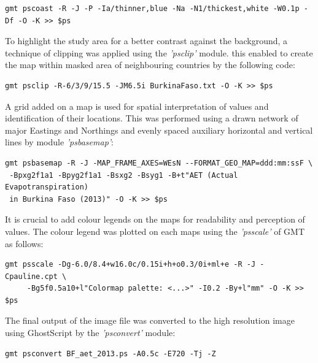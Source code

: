 \documentclass[knowledge,article,submit,pdftex,moreauthors]{Definitions/mdpi}
\begin{document}
 \begin{small}
 \begin{verbatim}
gmt pscoast -R -J -P -Ia/thinner,blue -Na -N1/thickest,white -W0.1p -Df -O -K >> $ps
  \end{verbatim} 
 \end{small}
 
 To highlight the study area for a better contrast against the background, a technique of clipping was applied using the \emph{'psclip'} module. this enabled to create the map within masked area of neighbouring countries by the following code: 
 
\begin{small}
 \begin{verbatim}
gmt psclip -R-6/3/9/15.5 -JM6.5i BurkinaFaso.txt -O -K >> $ps
   \end{verbatim} 
 \end{small}
 
 A grid added on a map is used for spatial interpretation of values and identification of their locations. This was performed using a drawn network of major Eastings and Northings and evenly spaced auxiliary horizontal and vertical lines by module \emph{'psbasemap'}:
 
 \begin{small}
 \begin{verbatim}
gmt psbasemap -R -J -MAP_FRAME_AXES=WEsN --FORMAT_GEO_MAP=ddd:mm:ssF \
 -Bpxg2f1a1 -Bpyg2f1a1 -Bsxg2 -Bsyg1 -B+t"AET (Actual Evapotranspiration) 
 in Burkina Faso (2013)" -O -K >> $ps
     \end{verbatim} 
 \end{small}
 
It is crucial to add colour legends on the maps for readability and perception of values. The colour legend was plotted on each maps using the \emph{'psscale'} of GMT as follows: 
 
 \begin{small}
 \begin{verbatim}
gmt psscale -Dg-6.0/8.4+w16.0c/0.15i+h+o0.3/0i+ml+e -R -J -Cpauline.cpt \
     -Bg5f0.5a10+l"Colormap palette: <...>" -I0.2 -By+l"mm" -O -K >> $ps
    \end{verbatim} 
 \end{small}

The final output of the image file was converted to the high resolution image using GhostScript by the \emph{'psconvert'} module: 

\begin{small}
\begin{verbatim}
gmt psconvert BF_aet_2013.ps -A0.5c -E720 -Tj -Z
\end{verbatim} 
\end{small}
 
\end{document}
